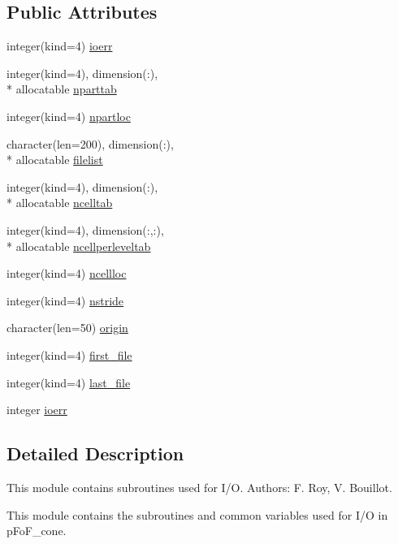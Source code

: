 \subsection*{Public Attributes}
\begin{DoxyCompactItemize}
\item 
integer(kind=4) \hyperlink{classmodio_a62b213d7b9f52071f903b877ee52c86b}{ioerr}
\item 
integer(kind=4), dimension(\-:), \\*
allocatable \hyperlink{classmodio_a4a7b05300378789a7f94a217ba703153}{nparttab}
\item 
integer(kind=4) \hyperlink{classmodio_a0bf1df6ff1e675aabce26f3d7289a700}{npartloc}
\item 
character(len=200), dimension(\-:), \\*
allocatable \hyperlink{classmodio_a31e8a393faa96e92df4d56794cd2eadd}{filelist}
\item 
integer(kind=4), dimension(\-:), \\*
allocatable \hyperlink{classmodio_a0a0852674d63f2d9f6c23969d3f7016c}{ncelltab}
\item 
integer(kind=4), dimension(\-:,\-:), \\*
allocatable \hyperlink{classmodio_a541838a88faeed3af974f875bd73ee00}{ncellperleveltab}
\item 
integer(kind=4) \hyperlink{classmodio_a1c862995bd67ce8f4a3305dad6022064}{ncellloc}
\item 
integer(kind=4) \hyperlink{classmodio_a6661d8a6f911c13b15cebca52e76b6fc}{nstride}
\item 
character(len=50) \hyperlink{classmodio_a12ada16137589f81ccc218e3b77f25c6}{origin}
\item 
integer(kind=4) \hyperlink{classmodio_a2eee1b20e9f6d0c4ab4e219d76aefc9a}{first\-\_\-file}
\item 
integer(kind=4) \hyperlink{classmodio_a3e203a61ede6084d5dd96d438500b155}{last\-\_\-file}
\item 
integer \hyperlink{classmodio_aea2235cb150c2f86e8564ce3d2e606a1}{ioerr}
\end{DoxyCompactItemize}


\subsection{Detailed Description}
This module contains subroutines used for I/\-O. Authors\-: F. Roy, V. Bouillot. 

This module contains the subroutines and common variables used for I/\-O in p\-Fo\-F\-\_\-cone.

